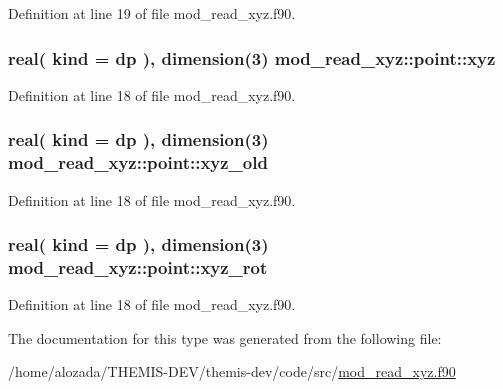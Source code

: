 Definition at line 19 of file mod\+\_\+read\+\_\+xyz.\+f90.

\subsubsection[{\texorpdfstring{xyz}{xyz}}]{\setlength{\rightskip}{0pt plus 5cm}real( kind = dp ), dimension(3) mod\+\_\+read\+\_\+xyz\+::point\+::xyz}\hypertarget{structmod__read__xyz_1_1point_a0f0abb4553673dd53beed006d23e8044}{}\label{structmod__read__xyz_1_1point_a0f0abb4553673dd53beed006d23e8044}


Definition at line 18 of file mod\+\_\+read\+\_\+xyz.\+f90.

\subsubsection[{\texorpdfstring{xyz\+\_\+old}{xyz_old}}]{\setlength{\rightskip}{0pt plus 5cm}real( kind = dp ), dimension(3) mod\+\_\+read\+\_\+xyz\+::point\+::xyz\+\_\+old}\hypertarget{structmod__read__xyz_1_1point_a850b0992c9c67aa0ab7f0cc5ce6e06a4}{}\label{structmod__read__xyz_1_1point_a850b0992c9c67aa0ab7f0cc5ce6e06a4}


Definition at line 18 of file mod\+\_\+read\+\_\+xyz.\+f90.

\subsubsection[{\texorpdfstring{xyz\+\_\+rot}{xyz_rot}}]{\setlength{\rightskip}{0pt plus 5cm}real( kind = dp ), dimension(3) mod\+\_\+read\+\_\+xyz\+::point\+::xyz\+\_\+rot}\hypertarget{structmod__read__xyz_1_1point_a8065dc01a4172608ef691b470ad6b781}{}\label{structmod__read__xyz_1_1point_a8065dc01a4172608ef691b470ad6b781}


Definition at line 18 of file mod\+\_\+read\+\_\+xyz.\+f90.



The documentation for this type was generated from the following file\+:\begin{DoxyCompactItemize}
\item 
/home/alozada/\+T\+H\+E\+M\+I\+S-\/\+D\+E\+V/themis-\/dev/code/src/\hyperlink{mod__read__xyz_8f90}{mod\+\_\+read\+\_\+xyz.\+f90}\end{DoxyCompactItemize}
